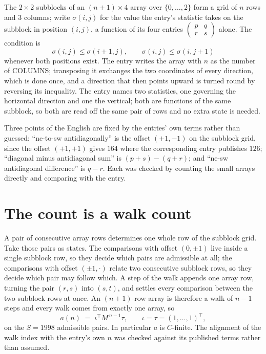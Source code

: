 \documentclass[11pt,a4paper]{article}
\theoremstyle{plain}
\theoremstyle{definition}
\begin{document}
The $2\times2$ subblocks of an $(n+1)\times4$ array over $\{0,\dots,2\}$ form a grid
of $n$ rows and $3$ columns; write $\sigma(i,j)$ for the value the entry's statistic takes on
the subblock in position $(i,j)$, a function of its four entries
$\begin{pmatrix}p&q\\r&s\end{pmatrix}$ alone. The condition is
\[
\sigma(i,j)\le\sigma(i+1,j),\qquad \sigma(i,j)\le\sigma(i,j+1)
\]
whenever both positions exist. The entry writes the array with $n$ as the number of COLUMNS; transposing it exchanges the two coordinates of every direction, which is done once, and a direction that then points upward is turned round by reversing its inequality. The entry names two statistics, one governing the horizontal direction and one the vertical; both are functions of the same subblock, so both are read off the same pair of rows and no extra state is needed.

Three points of the English are fixed by the entries' own terms rather than guessed:
``ne-to-sw antidiagonally'' is the offset $(+1,-1)$ on the subblock grid, since the offset
$(+1,+1)$ gives $164$ where the corresponding entry publishes $126$; ``diagonal minus
antidiagonal sum'' is $(p+s)-(q+r)$; and ``ne-sw antidiagonal difference'' is $q-r$. Each was
checked by counting the small arrays directly and comparing with the entry.

\section{The count is a walk count}

A pair of consecutive array rows determines one whole row of the subblock grid. Take those
pairs as states. The comparisons with offset $(0,\pm1)$ live inside a single subblock row, so
they decide which pairs are admissible at all; the comparisons with offset $(\pm1,\cdot)$
relate two consecutive subblock rows, so they decide which pair may follow which. A step of the
walk appends one array row, turning the pair $(r,s)$ into $(s,t)$, and settles every comparison
between the two subblock rows at once. An $(n+1)$-row array is therefore a walk of $n-1$ steps
and every walk comes from exactly one array, so
\[
a(n)\;=\;\iota^{\!\top}M^{\,n-1}\tau,\qquad \iota=\tau=(1,\dots,1)^{\!\top},
\]
on the $S=1998$ admissible pairs. In particular $a$ is $C$-finite. The alignment of the walk
index with the entry's own $n$ was checked against its published terms rather than assumed.
\end{document}
